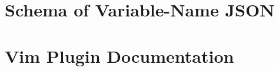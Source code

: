 \begin{appendices}
	\chapter{Schema of Variable-Name JSON}
	\label{appendix:schema}
	
	\chapter{Vim Plugin Documentation}
	\label{appendix:vimplugindoc}
	

\end{appendices}
